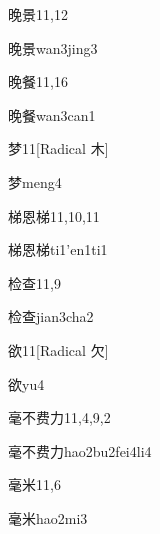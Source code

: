 \begin{entry}{晚景}{11,12}
  \begin{phonetics}{晚景}{wan3jing3}
  \end{phonetics}
\end{entry}

\begin{entry}{晚餐}{11,16}
  \begin{phonetics}{晚餐}{wan3can1}
  \end{phonetics}
\end{entry}

\begin{entry}{梦}{11}[Radical 木]
  \begin{phonetics}{梦}{meng4}
  \end{phonetics}
\end{entry}

\begin{entry}{梯恩梯}{11,10,11}
  \begin{phonetics}{梯恩梯}{ti1'en1ti1}
  \end{phonetics}
\end{entry}

\begin{entry}{检查}{11,9}
  \begin{phonetics}{检查}{jian3cha2}
  \end{phonetics}
\end{entry}

\begin{entry}{欲}{11}[Radical 欠]
  \begin{phonetics}{欲}{yu4}
  \end{phonetics}
\end{entry}

\begin{entry}{毫不费力}{11,4,9,2}
  \begin{phonetics}{毫不费力}{hao2bu2fei4li4}
  \end{phonetics}
\end{entry}

\begin{entry}{毫米}{11,6}
  \begin{phonetics}{毫米}{hao2mi3}
  \end{phonetics}
\end{entry}

